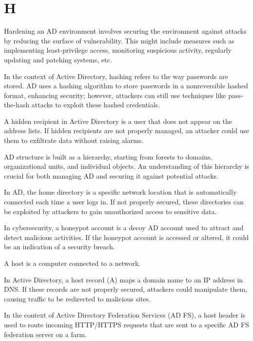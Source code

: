 \section*{H}
 Hardening an AD environment involves securing the environment against attacks by reducing the surface of vulnerability. This might include measures such as implementing least-privilege access, monitoring suspicious activity, regularly updating and patching systems, etc.

 In the context of Active Directory, hashing refers to the way passwords are stored. AD uses a hashing algorithm to store passwords in a nonreversible hashed format, enhancing security; however, attackers can still use techniques like pass-the-hash attacks to exploit these hashed credentials.

 A hidden recipient in Active Directory is a user that does not appear on the address lists. If hidden recipients are not properly managed, an attacker could use them to exfiltrate data without raising alarms.

 AD structure is built as a hierarchy, starting from forests to domains, organizational units, and individual objects. An understanding of this hierarchy is crucial for both managing AD and securing it against potential attacks.

 In AD, the home directory is a specific network location that is automatically connected each time a user logs in. If not properly secured, these directories can be exploited by attackers to gain unauthorized access to sensitive data.

 In cybersecurity, a honeypot account is a decoy AD account used to attract and detect malicious activities. If the honeypot account is accessed or altered, it could be an indication of a security breach.

 A host is a computer connected to a network.

 In Active Directory, a host record (A) maps a domain name to an IP address in DNS. If these records are not properly secured, attackers could manipulate them, causing traffic to be redirected to malicious sites.

 In the context of Active Directory Federation Services (AD FS), a host header is used to route incoming HTTP/HTTPS requests that are sent to a specific AD FS federation server on a farm.

